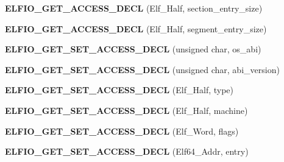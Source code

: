 \begin{DoxyCompactItemize}
\item 
{\bfseries E\+L\+F\+I\+O\+\_\+\+G\+E\+T\+\_\+\+A\+C\+C\+E\+S\+S\+\_\+\+D\+E\+CL} (Elf\+\_\+\+Half, section\+\_\+entry\+\_\+size)\hypertarget{class_e_l_f_i_o_1_1elf__header_a9acbc16b6ae72ab36d994202e8318fbc}{}\label{class_e_l_f_i_o_1_1elf__header_a9acbc16b6ae72ab36d994202e8318fbc}

\item 
{\bfseries E\+L\+F\+I\+O\+\_\+\+G\+E\+T\+\_\+\+A\+C\+C\+E\+S\+S\+\_\+\+D\+E\+CL} (Elf\+\_\+\+Half, segment\+\_\+entry\+\_\+size)\hypertarget{class_e_l_f_i_o_1_1elf__header_a27fdb0ac591e8d2fed4c30a9da83b161}{}\label{class_e_l_f_i_o_1_1elf__header_a27fdb0ac591e8d2fed4c30a9da83b161}

\item 
{\bfseries E\+L\+F\+I\+O\+\_\+\+G\+E\+T\+\_\+\+S\+E\+T\+\_\+\+A\+C\+C\+E\+S\+S\+\_\+\+D\+E\+CL} (unsigned char, os\+\_\+abi)\hypertarget{class_e_l_f_i_o_1_1elf__header_aeb82c28cee1d098696fd422ba47767ba}{}\label{class_e_l_f_i_o_1_1elf__header_aeb82c28cee1d098696fd422ba47767ba}

\item 
{\bfseries E\+L\+F\+I\+O\+\_\+\+G\+E\+T\+\_\+\+S\+E\+T\+\_\+\+A\+C\+C\+E\+S\+S\+\_\+\+D\+E\+CL} (unsigned char, abi\+\_\+version)\hypertarget{class_e_l_f_i_o_1_1elf__header_a48784e215429b29fc0f99cbc1c4da43a}{}\label{class_e_l_f_i_o_1_1elf__header_a48784e215429b29fc0f99cbc1c4da43a}

\item 
{\bfseries E\+L\+F\+I\+O\+\_\+\+G\+E\+T\+\_\+\+S\+E\+T\+\_\+\+A\+C\+C\+E\+S\+S\+\_\+\+D\+E\+CL} (Elf\+\_\+\+Half, type)\hypertarget{class_e_l_f_i_o_1_1elf__header_a951284ab4a8e285e0b0668c534bbed60}{}\label{class_e_l_f_i_o_1_1elf__header_a951284ab4a8e285e0b0668c534bbed60}

\item 
{\bfseries E\+L\+F\+I\+O\+\_\+\+G\+E\+T\+\_\+\+S\+E\+T\+\_\+\+A\+C\+C\+E\+S\+S\+\_\+\+D\+E\+CL} (Elf\+\_\+\+Half, machine)\hypertarget{class_e_l_f_i_o_1_1elf__header_a25882d82b5a01e3f28e10a76e3986776}{}\label{class_e_l_f_i_o_1_1elf__header_a25882d82b5a01e3f28e10a76e3986776}

\item 
{\bfseries E\+L\+F\+I\+O\+\_\+\+G\+E\+T\+\_\+\+S\+E\+T\+\_\+\+A\+C\+C\+E\+S\+S\+\_\+\+D\+E\+CL} (Elf\+\_\+\+Word, flags)\hypertarget{class_e_l_f_i_o_1_1elf__header_a27fe3dbfa7ef6f7de22accf35cab00ab}{}\label{class_e_l_f_i_o_1_1elf__header_a27fe3dbfa7ef6f7de22accf35cab00ab}

\item 
{\bfseries E\+L\+F\+I\+O\+\_\+\+G\+E\+T\+\_\+\+S\+E\+T\+\_\+\+A\+C\+C\+E\+S\+S\+\_\+\+D\+E\+CL} (Elf64\+\_\+\+Addr, entry)\hypertarget{class_e_l_f_i_o_1_1elf__header_aab270cef87e0d7f044724c8078500d9d}{}\label{class_e_l_f_i_o_1_1elf__header_aab270cef87e0d7f044724c8078500d9d}


\end{DoxyCompactItemize}

